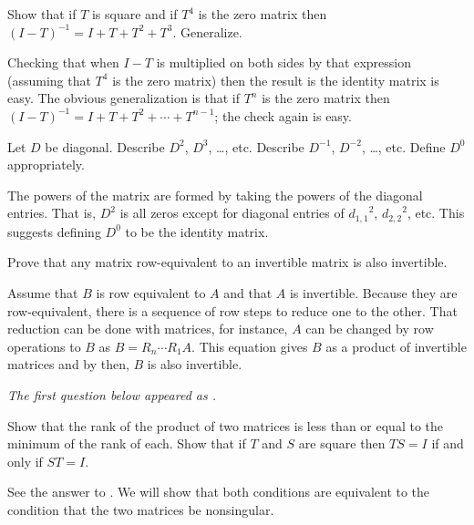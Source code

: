 \begin{exercises}
  \recommended \item
    Show that if \( T \) is square and if \( T^4 \) is the zero matrix
    then \( (I-T)^{-1}=I+T+T^2+T^3 \).
    Generalize.
    \begin{answer}
      Checking that when $I-T$ is multiplied on both sides by that expression
      (assuming that $T^4$ is the zero matrix) then the result is the 
      identity matrix is easy.
      The obvious generalization is that if \( T^n \) is the zero matrix
      then \( (I-T)^{-1}=I+T+T^2+\cdots+T^{n-1} \); the check again is
      easy.  
    \end{answer}
  \recommended \item 
    Let \( D \) be diagonal.
    Describe \( D^2 \), \( D^3 \), \ldots\thinspace, etc.
    Describe \( D^{-1} \), \( D^{-2} \), \ldots\thinspace, etc.
    Define \( D^0 \) appropriately.
    \begin{answer}
      The powers of the matrix are formed by taking the powers of the
      diagonal entries.
      That is,  \( D^2 \) is all zeros except for diagonal entries of
      \( {d_{1,1}}^2 \), \( {d_{2,2}}^2 \), etc.
      This suggests defining \( D^0 \) to be the identity matrix.  
    \end{answer}
  \item
    Prove that any matrix row-equivalent to an invertible matrix is also
    invertible.
    \begin{answer}
      Assume that $B$ is row equivalent to $A$ and that $A$ is invertible.
      Because they are row-equivalent, there is a sequence of row steps 
      to reduce one to the other.
      That reduction can be done with matrices, for instance, $A$ can be
      changed by row operations to $B$ as $B=R_n\cdots R_1A$.
      This equation gives $B$ as a product of invertible matrices and
      by  then, $B$ is also invertible.  
    \end{answer}
  \item 
    \textit{The first question below appeared as
    .}
    \begin{exparts}
      \partsitem Show that the rank of the product of two matrices is less than
        or equal to the minimum of the rank of each.
      \partsitem Show that if \( T \)  and \( S \) are square then \( TS=I \)
         if and only if \( ST=I \).
    \end{exparts}
    \begin{answer}
      \begin{exparts}
        \partsitem See the answer to
          .
        \partsitem We will show that both conditions are equivalent to
          the condition that the two matrices be nonsingular. 


\end{exparts}
\end{answer}
\end{exercises}
